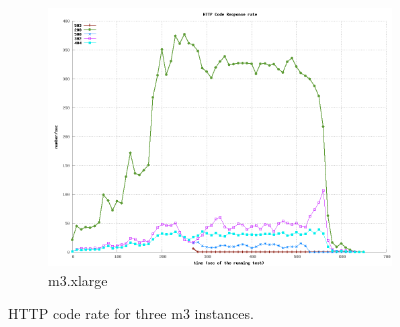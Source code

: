 \documentclass[dvips,12pt]{article}
\begin{document}
\begin{figure}[h!]
\begin{subfigure}[b]{0.3\textwidth}
        \includegraphics[width=\textwidth]{images/vertical/http_code_xlarge.png}
        \caption{m3.xlarge}
    \end{subfigure}
    \caption{HTTP code rate for three m3 instances.}
\end{figure}
\end{document}

